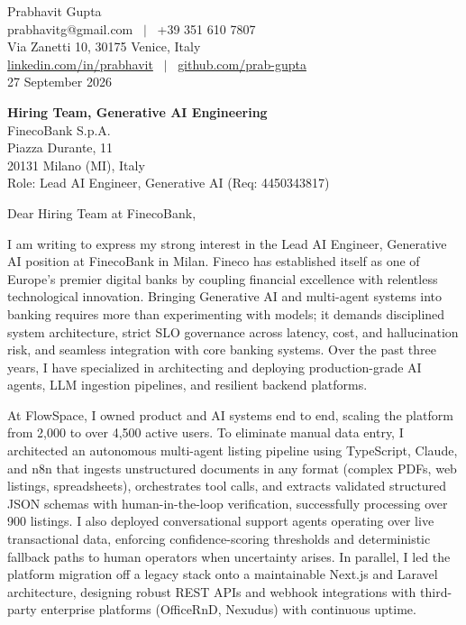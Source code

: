 \documentclass[10.5pt,a4paper]{article}
\begin{document}
Prabhavit Gupta\\
prabhavitg@gmail.com ~$\vert$~ +39 351 610 7807\\
Via Zanetti 10, 30175 Venice, Italy\\
\href{https://www.linkedin.com/in/prabhavit/}{linkedin.com/in/prabhavit} ~$\vert$~ \href{https://github.com/prab-gupta}{github.com/prab-gupta}\\
27 September 2026

\textbf{Hiring Team, Generative AI Engineering}\\
FinecoBank S.p.A.\\
Piazza Durante, 11\\
20131 Milano (MI), Italy\\
Role: Lead AI Engineer, Generative AI (Req: 4450343817)

Dear Hiring Team at FinecoBank,

I am writing to express my strong interest in the Lead AI Engineer, Generative AI position at FinecoBank in Milan. Fineco has established itself as one of Europe's premier digital banks by coupling financial excellence with relentless technological innovation. Bringing Generative AI and multi-agent systems into banking requires more than experimenting with models; it demands disciplined system architecture, strict SLO governance across latency, cost, and hallucination risk, and seamless integration with core banking systems. Over the past three years, I have specialized in architecting and deploying production-grade AI agents, LLM ingestion pipelines, and resilient backend platforms.

At FlowSpace, I owned product and AI systems end to end, scaling the platform from 2,000 to over 4,500 active users. To eliminate manual data entry, I architected an autonomous multi-agent listing pipeline using TypeScript, Claude, and n8n that ingests unstructured documents in any format (complex PDFs, web listings, spreadsheets), orchestrates tool calls, and extracts validated structured JSON schemas with human-in-the-loop verification, successfully processing over 900 listings. I also deployed conversational support agents operating over live transactional data, enforcing confidence-scoring thresholds and deterministic fallback paths to human operators when uncertainty arises. In parallel, I led the platform migration off a legacy stack onto a maintainable Next.js and Laravel architecture, designing robust REST APIs and webhook integrations with third-party enterprise platforms (OfficeRnD, Nexudus) with continuous uptime.
\end{document}
